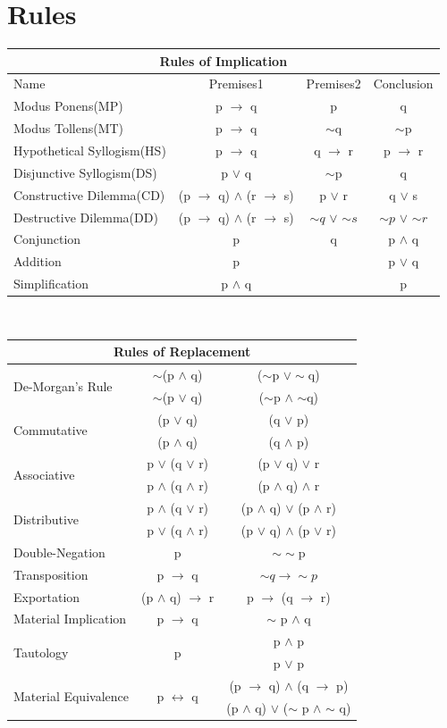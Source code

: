 \documentclass[a4paper,oneside]{book}
\begin{document}
\section{Rules}
\begin{tabular}[H]{|l|c|c|c|}
\hline
\multicolumn{4}{|c|}{Rules of Implication}\\
\hline Name & Premises1 & Premises2 & Conclusion \\ \hline
Modus Ponens(MP) & p $\to$ q & p & q\\
Modus Tollens(MT) & p $\to$ q & $\sim$q & $\sim$p \\
Hypothetical Syllogism(HS) & p $\to$ q & q $\to$ r & p $\to$ r \\
Disjunctive Syllogism(DS) & p $\lor$ q & $\sim$p & q\\
Constructive Dilemma(CD) & (p $\to$ q) $\wedge$ (r $\to$ s) & p $\lor$ r & q
$\lor$ s\\
Destructive Dilemma(DD) & (p $\to$ q) $\wedge$ (r $\to$ s) & $\sim q$ $\lor$ $\sim s$ & $\sim p$
$\lor$ $\sim r$\\ 
Conjunction & p & q & p $\wedge$ q\\
Addition & p & & p $\lor$ q\\
Simplification & p $\wedge$ q & & p\\ \hline
\end{tabular}
\\
\begin{tabular}[H]{|l|c|c|}
\hline
\multicolumn{3}{|c|}{Rules of Replacement}\\ \hline
\multirow{2}{*}{De-Morgan's Rule} & $\sim$(p $\wedge$ q) & ($\sim$p $\lor
\sim$q)\\
& $\sim$(p $\lor$ q) & ($\sim$p $\wedge$ $\sim$q) \\ \hline
\multirow{2}{*}{Commutative} & (p $\lor$ q) & (q $\lor$ p) \\
& (p $\wedge$ q) & (q $\wedge$ p) \\ \hline
\multirow{2}{*}{Associative} & p $\lor$ (q $\lor$ r) & (p
$\lor$ q) $\lor$ r \\ 
& p $\wedge$ (q $\wedge$ r) & (p $\wedge$ q) $\wedge$ r \\ \hline
\multirow{2}{*}{Distributive} & p $\wedge$ (q $\lor$ r) &
(p $\wedge$ q) $\lor$ (p $\wedge$ r) \\
& p $\lor$ (q $\wedge$ r) & (p $\lor$ q) $\wedge$ (p $\lor$
r)\\ \hline
Double-Negation & p & $\sim \sim$p\\ \hline
Transposition & p $\to$ q & $\sim q \to \sim p$\\ \hline
Exportation & (p $\wedge$ q) $\to$ r & p $\to$ (q $\to$ r) \\ \hline
Material Implication & p $\to$ q & $\sim$ p $\wedge$ q \\ \hline
 \multirow{2}{*}{Tautology} & \multirow{2}{*}{p} & p $\wedge$ p\\ 
& & p $\lor$ p \\ \hline
\multirow{2}{*}{Material Equivalence} & \multirow{2}{*}{p $\leftrightarrow$ q} & (p $\to$ q) $\wedge$ (q $\to$ p)\\
& & (p $\wedge$ q) $\lor$ ($\sim$ p $\wedge$ $\sim$ q) 
\\ \hline
\end{tabular}
\end{document}
